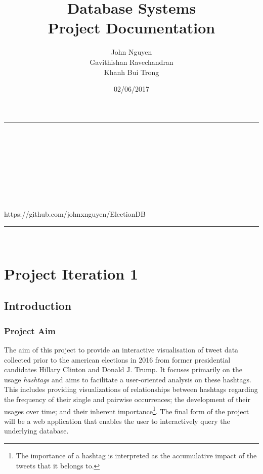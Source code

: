 \documentclass[a4paper, 12pt]{report}
\makeatletter
\newcommand{\LINE}{\rule{\linewidth}{0.5pt}}
\renewcommand{\maketitle}{
\vspace*{20pt}
\LINE\\
\vspace{2pt}\\
{\huge \noindent\sffamily{\@title}}\\
\vspace{2pt}\\
\hfill {\large \@date}\\
\vspace{2pt}\\
{\large \@author}\\
\vspace{2pt}\\
https://github.com/johnxnguyen/ElectionDB\\
\LINE\\
\vspace{4pt}
}
\makeatother
\begin{document}
\title{\textbf{Database Systems}\\Project Documentation}
\date{02/06/2017}
\author{John Nguyen\\Gavithishan Ravechandran\\Khanh Bui Trong}
\maketitle
\thispagestyle{empty}


\chapter{Project Iteration 1}
\label{ch:iteration1}

\newpage
\section{Introduction}
\subsection{Project Aim}
The aim of this project to provide an interactive visualisation of tweet data collected prior to the american elections in 2016 from former presidential candidates Hillary Clinton and Donald J. Trump. It focuses primarily on the usage \emph{hashtags} and aims to facilitate a user-oriented analysis on these hashtags. This includes providing visualizations of relationships between hashtags regarding the frequency of their single and pairwise occurrences; the development of their usages over time; and their inherent importance\footnote{The importance of a hashtag is interpreted as the accumulative impact of the tweets that it belongs to.}. The final form of the project will be a web application that enables the user to interactively query the underlying database.
\end{document}
